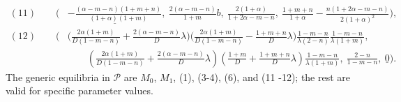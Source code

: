 \documentclass[11pt]{article}
\theoremstyle{remark}
\begin{document}
\begin{align*}
(11)\qquad  \Big(&\underline{ -\tfrac{(\alpha-m-n)(1+m+n)}{(1+\alpha)(1+m)}}, \:\tfrac{2(\alpha-m-n)}{1+m}b, \:\tfrac{2(1+\alpha)}{1+2\alpha-m-n}, \:\tfrac{1+m+n}{1+\alpha} - \tfrac{n(1+2\alpha-m-n)}{2(1+\alpha)^2}\Big),
\\[4pt]
(12)\qquad  \bigg(&\Big ( \tfrac{2\alpha(1+m)}{D(1-m-n)} + \tfrac{2(\alpha-m-n)}{D}\lambda\Big)\Big(\tfrac{2\alpha(1+m)}{D(1-m-n)} - \tfrac{1+m+n}{D}\lambda\Big)\tfrac{1-m-n}{\lambda(2-n)}\tfrac{1-m-n}{\lambda(1+m)}, \\
 &\qquad \left( \tfrac{2\alpha(1+m)}{D(1-m-n)} + \tfrac{2(\alpha-m-n)}{D}\lambda\right)\left(\tfrac{1+m}{D} + \tfrac{1+m+n}{D}\lambda\right)\tfrac{1-m-n}{\lambda(1+m)}, \ \tfrac{2-n}{1-m-n}, \ \underline{0}\bigg).
\end{align*}
The generic equilibria in $\mathcal{P}$ are $M_0$, $M_1$, (1), (3-4), (6), and (11 -12); the rest are valid for specific parameter values.
\end{document}
